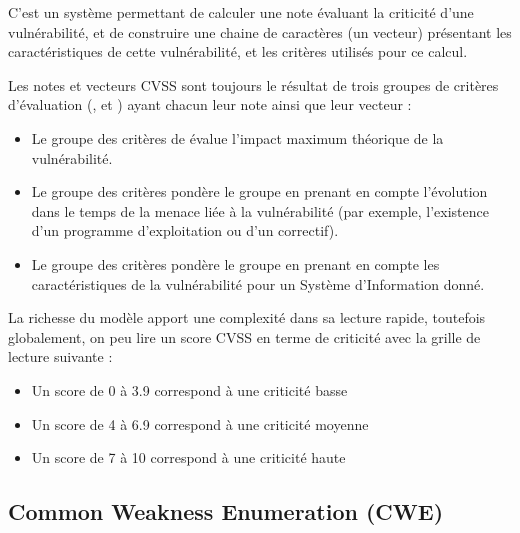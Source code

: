 
C'est un système permettant de calculer une note évaluant la criticité d'une vulnérabilité, et de construire une chaine de caractères (un vecteur) présentant les caractéristiques de cette vulnérabilité, et les critères utilisés pour ce calcul.

Les notes et vecteurs CVSS sont toujours le résultat de trois groupes de critères d'évaluation (,  et ) ayant chacun leur note ainsi que leur vecteur :
\begin{itemize}
  \item Le groupe des critères de\textbf{ } évalue l'impact maximum théorique de la vulnérabilité.
  \item Le groupe des critères\textbf{   }pondère le groupe  en prenant en compte  l'évolution dans le temps de la menace liée à la vulnérabilité  (par exemple, l'existence d'un programme d’exploitation ou d'un correctif).
  \item Le groupe des critères\textbf{  }pondère le groupe  en prenant en compte les caractéristiques de la vulnérabilité pour un Système d'Information donné.
\end{itemize}

La richesse du modèle apport une complexité dans sa lecture rapide, toutefois globalement, on peu lire un score CVSS en terme de criticité avec la grille de lecture suivante :

\begin{itemize}
  \item Un score de 0 à 3.9 correspond à une criticité basse
  \item Un score de 4 à 6.9 correspond à une criticité moyenne
  \item Un score de 7 à 10 correspond à une criticité haute
\end{itemize}


\subsection{Common Weakness Enumeration (CWE)}

